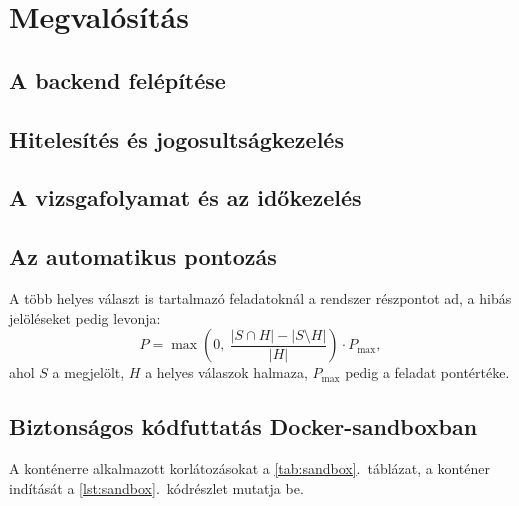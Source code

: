 \chapter{Megvalósítás}
\label{ch:megvalositas}

\section{A backend felépítése}

\section{Hitelesítés és jogosultságkezelés}

\section{A vizsgafolyamat és az időkezelés}

\section{Az automatikus pontozás}
A több helyes választ is tartalmazó feladatoknál a rendszer részpontot ad, a hibás jelöléseket
pedig levonja:
\begin{equation}
  P = \max\!\left(0,\ \frac{|S \cap H| - |S \setminus H|}{|H|}\right) \cdot P_{\max},
  \label{eq:tobbvalasz}
\end{equation}
ahol $S$ a megjelölt, $H$ a helyes válaszok halmaza, $P_{\max}$ pedig a feladat pontértéke.

\section{Biztonságos kódfuttatás Docker-sandboxban}
A konténerre alkalmazott korlátozásokat a \ref{tab:sandbox}.~táblázat, a konténer indítását
a \ref{lst:sandbox}.~kódrészlet mutatja be.

